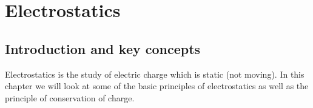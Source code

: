          \chapter{Electrostatics}
    \label{464e844ca5615087ea89d9d95dd9a43a}
         \section{Introduction and key concepts}
    \nopagebreak
    \label{m38780*cid2}
       
      \label{m38780*id200254}Electrostatics is the study of electric charge which is static (not moving). In this chapter we will look at some of the basic principles of electrostatics as well as the principle of conservation of charge. \par 
    \label{m38780*cid3}

